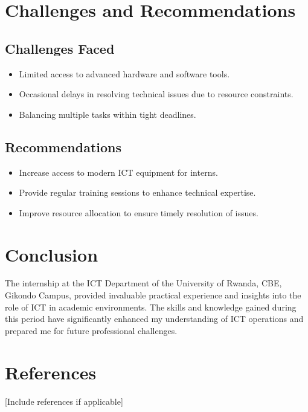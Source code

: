 \documentclass[a4paper,12pt]{report}
\begin{document}
\chapter{Challenges and Recommendations}
\section{Challenges Faced}
\begin{itemize}
\item Limited access to advanced hardware and software tools.
\item Occasional delays in resolving technical issues due to resource constraints.
\item Balancing multiple tasks within tight deadlines.
\end{itemize}

\section{Recommendations}
\begin{itemize}
\item Increase access to modern ICT equipment for interns.
\item Provide regular training sessions to enhance technical expertise.
\item Improve resource allocation to ensure timely resolution of issues.
\end{itemize}

\chapter{Conclusion}
The internship at the ICT Department of the University of Rwanda, CBE, Gikondo Campus, provided invaluable practical experience and insights into the role of ICT in academic environments. The skills and knowledge gained during this period have significantly enhanced my understanding of ICT operations and prepared me for future professional challenges.

\chapter*{References}
[Include references if applicable]
\end{document}
